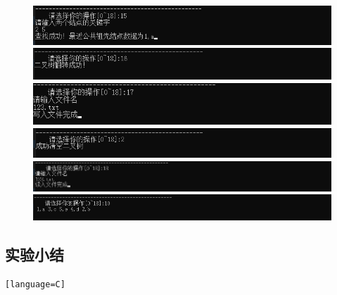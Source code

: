 \documentclass[supercite]{Experimental_Report}
\theoremstyle{definition}
\begin{document}
\begin{sloppypar}
\begin{figure}[H]
\end{figure} 

\begin{figure}[H]
	\includegraphics[width=16cm]{pic3//15.png}
	\includegraphics[width=16cm]{pic3//16.png}
	\includegraphics[width=16cm]{pic3//17.png}
	\includegraphics[width=16cm]{pic3//18.png}
	\includegraphics[width=16cm]{pic3//19.png}
	\includegraphics[width=16cm]{pic3//20.png}
\end{figure} 

\subsection{实验小结}
\begin{lstlisting}[breaklines][language=C]


\end{lstlisting}
\end{sloppypar}
\end{document}
